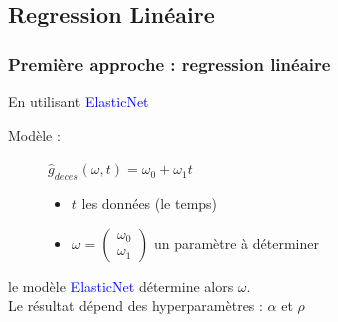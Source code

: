 \documentclass{beamer}[aspectratio = 43]
\begin{document}
\subsection*{Regression Linéaire}
\begin{frame}
	\frametitle{Première approche : regression linéaire}
	En utilisant \textcolor{blue}{ElasticNet} %
	
	\vspace{0.23 cm}
	Modèle :
	\begin{figure}[h]
		\begin{minipage}{0.35\textwidth}
			$\hat{g}_{deces} (\omega,t) =\omega_{0} +  \omega_{1} t$
		\end{minipage}%
		\begin{minipage}{0.65\textwidth}
			\begin{itemize}
				\item[] $t$ les données (le temps)
				\item[] 
				$\omega = 
				\begin{pmatrix}
					\omega_{0} \\
					\omega_{1}
				\end{pmatrix}$ un paramètre à déterminer
			\end{itemize}
		\end{minipage}
	\end{figure}
	\vspace{20pt}
	le modèle \textcolor{blue}{ElasticNet} détermine alors $\omega$.\\
	Le résultat dépend des hyperparamètres : $\alpha$ et $\rho$
	

\end{frame}
\end{document}
